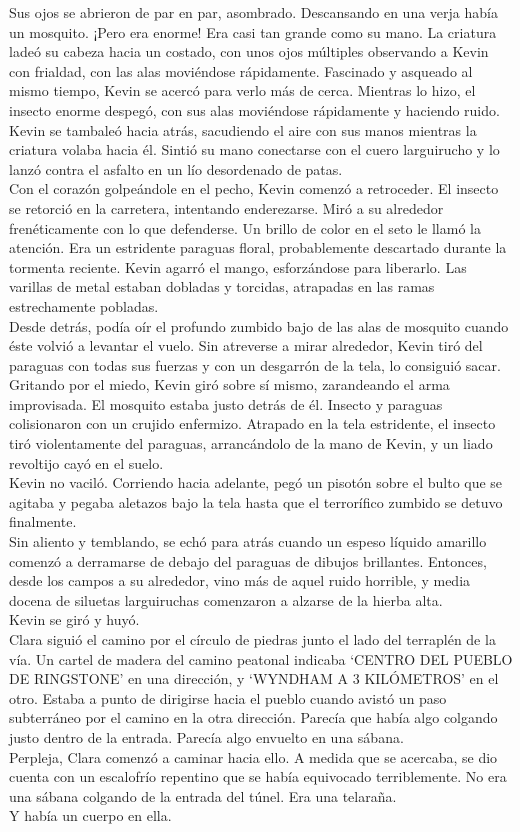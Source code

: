 {Sus ojos se abrieron de par en par, asombrado. Descansando en una verja
había un mosquito. ¡Pero era enorme! Era casi tan grande como su mano.
La criatura ladeó su cabeza hacia un costado, con unos ojos múltiples
observando a Kevin con frialdad, con las alas moviéndose rápidamente.
Fascinado y asqueado al mismo tiempo, Kevin se acercó para verlo más de
cerca. Mientras lo hizo, el insecto enorme despegó, con sus alas
moviéndose rápidamente y haciendo ruido.\\
Kevin se tambaleó hacia atrás, sacudiendo el aire con sus manos mientras
la criatura volaba hacia él. Sintió su mano conectarse con el cuero
larguirucho y lo lanzó contra el asfalto en un lío desordenado de
patas.\\
Con el corazón golpeándole en el pecho, Kevin comenzó a retroceder. El
insecto se retorció en la carretera, intentando enderezarse. Miró a su
alrededor frenéticamente con lo que defenderse. Un brillo de color en el
seto le llamó la atención. Era un estridente paraguas floral,
probablemente descartado durante la tormenta reciente. Kevin agarró el
mango, esforzándose para liberarlo. Las varillas de metal estaban
dobladas y torcidas, atrapadas en las ramas estrechamente pobladas.\\
Desde detrás, podía oír el profundo zumbido bajo de las alas de mosquito
cuando éste volvió a levantar el vuelo. Sin atreverse a mirar alrededor,
Kevin tiró del paraguas con todas sus fuerzas y con un desgarrón de la
tela, lo consiguió sacar.\\
Gritando por el miedo, Kevin giró sobre sí mismo, zarandeando el arma
improvisada. El mosquito estaba justo detrás de él. Insecto y paraguas
colisionaron con un crujido enfermizo. Atrapado en la tela estridente,
el insecto tiró violentamente del paraguas, arrancándolo de la mano de
Kevin, y un liado revoltijo cayó en el suelo.\\
Kevin no vaciló. Corriendo hacia adelante, pegó un pisotón sobre el
bulto que se agitaba y pegaba aletazos bajo la tela hasta que el
terrorífico zumbido se detuvo finalmente.\\
Sin aliento y temblando, se echó para atrás cuando un espeso líquido
amarillo comenzó a derramarse de debajo del paraguas de dibujos
brillantes. Entonces, desde los campos a su alrededor, vino más de aquel
ruido horrible, y media docena de siluetas larguiruchas comenzaron a
alzarse de la hierba alta.\\
Kevin se giró y huyó.\\[2\baselineskip]Clara siguió el camino por el
círculo de piedras junto el lado del terraplén de la vía. Un cartel de
madera del camino peatonal indicaba `CENTRO DEL PUEBLO DE RINGSTONE' en
una dirección, y `WYNDHAM A 3 KILÓMETROS' en el otro. Estaba a punto de
dirigirse hacia el pueblo cuando avistó un paso subterráneo por el
camino en la otra dirección. Parecía que había algo colgando justo
dentro de la entrada. Parecía algo envuelto en una sábana.\\
Perpleja, Clara comenzó a caminar hacia ello. A medida que se acercaba,
se dio cuenta con un escalofrío repentino que se había equivocado
terriblemente. No era una sábana colgando de la entrada del túnel. Era
una telaraña.\\
Y había un cuerpo en ella.\\
}
